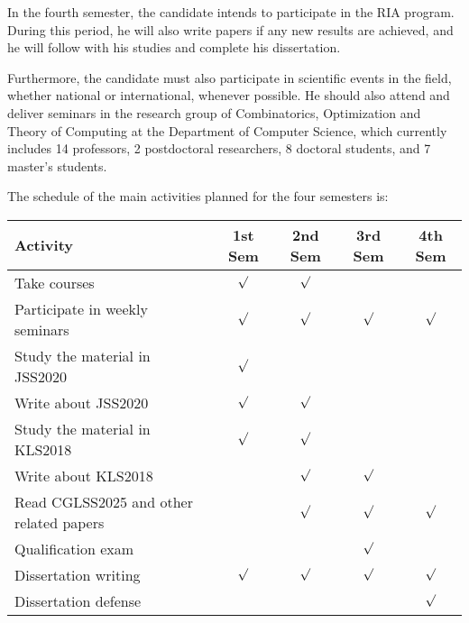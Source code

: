 \documentclass[12pt]{article}
\begin{document}
In the fourth semester, the candidate intends to participate in the RIA program.
During this period, he will also write papers if any new results are achieved, 
and he will follow with his studies and complete his dissertation.

Furthermore, the candidate must also participate in scientific events in the field, whether national or international, 
whenever possible. He should also attend and deliver seminars in the research group of Combinatorics, Optimization and Theory of Computing at the Department of Computer Science, which currently includes 14 professors, 
2 postdoctoral researchers, 8 doctoral students, and 7 master's students.

The schedule of the main activities planned for the four semesters is:

\begin{center}
{\footnotesize
\begin{tabular}{|l|c|c|c|c|}
\hline
\textbf{Activity} & \textbf{1st Sem} & \textbf{2nd Sem} & \textbf{3rd Sem} & \textbf{4th Sem} \\
\hline
Take courses                   & \(\surd\) & \(\surd\) &           &           \\
Participate in weekly seminars & \(\surd\) & \(\surd\) & \(\surd\) & \(\surd\) \\
Study the material in JSS2020  & \(\surd\) &           &           &           \\
Write about JSS2020            & \(\surd\) & \(\surd\) &           &           \\
Study the material in KLS2018  & \(\surd\) & \(\surd\) &           &           \\
Write about KLS2018            &           & \(\surd\) & \(\surd\) &           \\
Read CGLSS2025 and other related papers &  & \(\surd\) & \(\surd\) & \(\surd\) \\
Qualification exam            &            &           & \(\surd\) &           \\
Dissertation writing          & \(\surd\)  & \(\surd\) & \(\surd\) & \(\surd\) \\
Dissertation defense          &            &           &           & \(\surd\) \\
\hline
\end{tabular}
}
\end{center}
\end{document}
